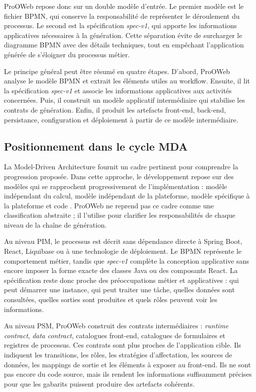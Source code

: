 ProOWeb repose donc sur un double modèle d'entrée. Le premier modèle est le fichier BPMN, qui conserve la responsabilité de représenter le déroulement du processus. Le second est la spécification \textit{spec-v1}, qui apporte les informations applicatives nécessaires à la génération. Cette séparation évite de surcharger le diagramme BPMN avec des détails techniques, tout en empêchant l'application générée de s'éloigner du processus métier.

Le principe général peut être résumé en quatre étapes. D'abord, ProOWeb analyse le modèle BPMN et extrait les éléments utiles au workflow. Ensuite, il lit la spécification \textit{spec-v1} et associe les informations applicatives aux activités concernées. Puis, il construit un modèle applicatif intermédiaire qui stabilise les contrats de génération. Enfin, il produit les artefacts front-end, back-end, persistance, configuration et déploiement à partir de ce modèle intermédiaire.

\subsection{Positionnement dans le cycle MDA}

La Model-Driven Architecture fournit un cadre pertinent pour comprendre la progression proposée. Dans cette approche, le développement repose sur des modèles qui se rapprochent progressivement de l'implémentation : modèle indépendant du calcul, modèle indépendant de la plateforme, modèle spécifique à la plateforme et code \cite{omg2014mda,mellor2003mda}. ProOWeb ne reprend pas ce cadre comme une classification abstraite ; il l'utilise pour clarifier les responsabilités de chaque niveau de la chaîne de génération.

Au niveau PIM, le processus est décrit sans dépendance directe à Spring Boot, React, Liquibase ou à une technologie de déploiement. Le BPMN représente le comportement métier, tandis que \textit{spec-v1} complète la conception applicative sans encore imposer la forme exacte des classes Java ou des composants React. La spécification reste donc proche des préoccupations métier et applicatives : qui peut démarrer une instance, qui peut traiter une tâche, quelles données sont consultées, quelles sorties sont produites et quels rôles peuvent voir les informations.

Au niveau PSM, ProOWeb construit des contrats intermédiaires : \textit{runtime contract}, \textit{data contract}, catalogues front-end, catalogues de formulaires et registres de processus. Ces contrats sont plus proches de l'application cible. Ils indiquent les transitions, les rôles, les stratégies d'affectation, les sources de données, les mappings de sortie et les éléments à exposer au front-end. Ils ne sont pas encore du code source, mais ils rendent les informations suffisamment précises pour que les gabarits puissent produire des artefacts cohérents.

